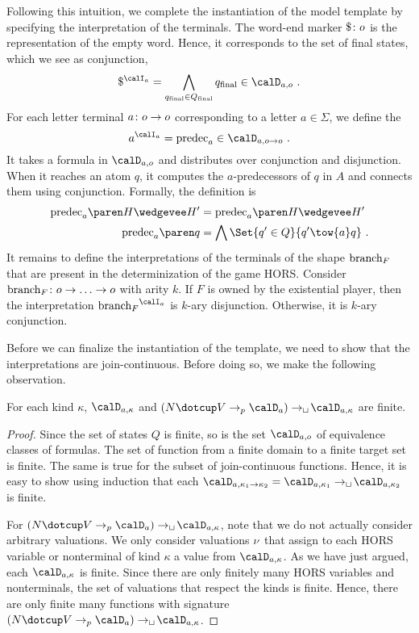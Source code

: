 \documentclass[../../diss.tex]{subfiles}
\begin{document}
Following this intuition, we complete the instantiation of the model template by specifying the interpretation of the terminals.
The word-end marker $\$ \colon o$ is the representation of the empty word.
Hence, it corresponds to the set of final states, which we see as conjunction,
\[
    \wordend^{\interpretationa} = \bigwedge_{\qfinal \in \QF} \qfinal \in \domaina{\ground}
    \ .
\]
For each letter terminal $a \colon o \to o$ corresponding to a letter $a \in \Sigma$, we define the 
\[
    a^{\interpretationa} = \predec{a} \in \domaina{\ground \to \ground}
    \ .
\]
It takes a formula in $\domaina{\ground}$ and distributes over conjunction and disjunction.
When it reaches an atom $q$, it computes the $a$-predecessors of $q$ in $A$ and connects them using conjunction.
Formally, the definition is
\begin{align*}
    \predec{a}{H \wedgevee H'} &= \predec{a}{H \wedgevee H'}
    \\
    \predec{a}{q} &= \bigwedge \Set{q' \in Q}{ q' \tow{a} q}
    \ .
\end{align*}
%
It remains to define the interpretations of the terminals of the shape $\text{branch}_F$ that are present in the determinization of the game HORS.\@
Consider $\text{branch}_F \colon o \to \ldots \to o$ with arity $k$.
If $F$ is owned by the existential player, then the interpretation ${\brancht_F}^{\interpretationa}$ is $k$-ary disjunction.
Otherwise, it is $k$-ary conjunction.

Before we can finalize the instantiation of the template, we need to show that the interpretations are join-continuous.
Before doing so, we make the following observation.

\begin{lemma}%
\label{Lemma:HORSSolvingDomainsFinite}%
    For each kind $\kappa$, $\domaina{\kappa}$ and $(N \dotcup V \pto \domaina) \cto \domaina{\kappa}$ are finite.
\end{lemma}

\begin{proof}
    Since the set of states $Q$ is finite, so is the set $\domaina{\ground}$ of equivalence classes of formulas.
    The set of function from a finite domain to a finite target set is finite.
    The same is true for the subset of join-continuous functions.
    Hence, it is easy to show using induction that each $\domaina{\kappa_1 \to \kappa_2} = \domaina{\kappa_1} \cto \domaina{\kappa_2}$ is finite.

    For $(N \dotcup V \pto \domaina) \cto \domaina{\kappa}$, note that we do not actually consider arbitrary valuations.
    We only consider valuations $\nu$ that assign to each HORS variable or nonterminal of kind $\kappa$ a value from $\domaina{\kappa}$.
    As we have just argued, each $\domaina{\kappa}$ is finite.
    Since there are only finitely many HORS variables and nonterminals, the set of valuations that respect the kinds is finite.
    Hence, there are only finite many functions with signature $(N \dotcup V \pto \domaina) \cto \domaina{\kappa}$.
\end{proof}
\end{document}
